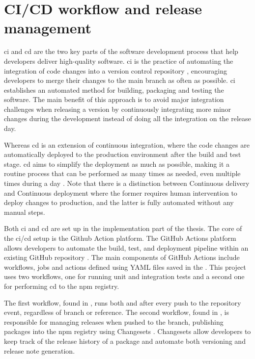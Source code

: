 \section{CI/CD workflow and release management}

\acrlong{ci} and \acrlong{cd} are the two key parts of the software development process that help developers deliver high-quality software. \acrfull{ci} is the practice of automating the integration of code changes into a version control repository \cite{atlassianContinuousIntegrationVs}, encouraging developers to merge their changes to the main branch as often as possible. \acrshort{ci} establishes an automated method for building, packaging and testing the software. The main benefit of this approach is to avoid major integration challenges when releasing a version by continuously integrating more minor changes during the development instead of doing all the integration on the release day.

Whereas \acrfull{cd} is an extension of continuous integration, where the code changes are automatically deployed to the production environment after the build and test stage. \acrshort{cd} aims to simplify the deployment as much as possible, making it a routine process that can be performed as many times as needed, even multiple times during a day \cite{WhatCICD}. Note that there is a distinction between Continuous delivery and Continuous deployment where the former requires human intervention to deploy changes to production, and the latter is fully automated without any manual steps.

Both \acrlong{ci} and \acrlong{cd} are set up in the implementation part of the thesis. The core of the \acrshort{ci}/\acrshort{cd} setup is the Github Action platform. The GitHub Actions platform allows developers to automate the build, test, and deployment pipeline within an existing GitHub repository \cite{UnderstandingGitHubActions}. The main components of GitHub Actions include workflows, jobs and actions defined using YAML files saved in the . This project uses two workflows, one for running unit and integration tests and a second one for performing \acrfull{cd} to the \acrshort{npm} registry.

The first workflow, found in , runs both  and  after every push to the repository event, regardless of branch or reference. The second workflow, found in , is responsible for managing releases when pushed to the  branch, publishing packages into the \acrshort{npm} registry using Changesets \cite{ChangesetsChangesets2023}. Changesets allow developers to keep track of the release history of a package and automate both versioning and release note generation.

